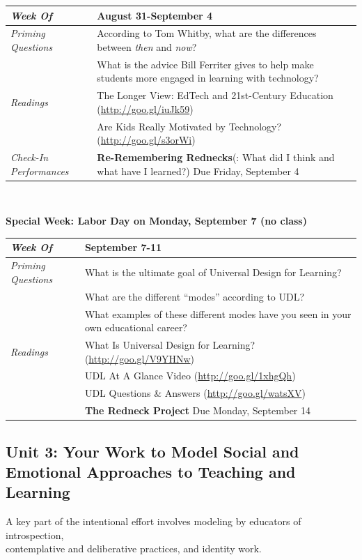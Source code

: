 \documentclass[two-side]{tufte-handout}
\newcommand{\gentopic}[1]{\begin{fullwidth}\begin{center}\faKey \textsf{#1}\end{center}\end{fullwidth}}
\newcommand{\tabpq}{\faQuestionCircle\medspace\textit{Priming Questions}}
\newcommand{\tabread}{\faBook\medspace\textit{Readings}}
\newcommand{\tabdt}{\faCalendar\medspace\textit{Week Of}}
\newcommand{\tabcheckin}{\faCheckSquareO\medspace\textit{Check-In Performances}}
\newcommand{\tabbreak}{\begin{fullwidth}\begin{center}\faAsterisk\faAsterisk\faAsterisk\\\end{center}\end{fullwidth}}
\newcommand{\specialweek}[1]{\begin{fullwidth}\begin{center}\textbf{\faBullhorn\medspace Special Week: #1 \medspace\faBullhorn}\end{center}\end{fullwidth}}
\newenvironment{tabsched}
	{\small
	\begin{tabular}{p{1.5in}p{4.5in}}
	\midrule}
	{\midrule
	\end{tabular}
	\normalsize}
\newcommand{\weekthree}{August 31-September 4}
\newcommand{\weekfour}{September 7-11}
\newcommand{\laborday}{Labor Day on Monday, September 7 (no class)}
\begin{document}
\begin{tabsched}
	\tabdt & \weekthree \\
	\midrule
	\tabpq & According to Tom Whitby, what are the differences between \textit{then} and \textit{now}? \\
	& What is the advice Bill Ferriter gives to help make students more engaged in learning with technology? \\
	\midrule
	\tabread & The Longer View: EdTech and 21st-Century Education (\url{http://goo.gl/iuJk59}) \\
	& Are Kids Really Motivated by Technology? (\url{http://goo.gl/s3orWi}) \\
	\midrule
	\tabcheckin & \textbf{Re-Remembering Rednecks}(: What did I think and what have I learned?) Due Friday, September 4 \\
\end{tabsched}

\tabbreak

\specialweek{\laborday}

\begin{tabsched}
	\tabdt & \weekfour \\
	\midrule
	\tabpq & What is the ultimate goal of Universal Design for Learning? \\
	& What are the different \enquote{modes} according to UDL? \\
	& What examples of these different modes have you seen in your own educational career? \\
	\midrule
	\tabread & What Is Universal Design for Learning? (\url{http://goo.gl/V9YHNw}) \\
	& UDL At A Glance Video (\url{http://goo.gl/1xhgQh}) \\
	& UDL Questions \& Answers (\url{http://goo.gl/watsXV}) \\
	\midrule
	\tabperfomance & \textbf{The Redneck Project} Due Monday, September 14 \\
\end{tabsched}

\newpage

\begin{fullwidth}
	\section{Unit 3: Your Work to Model Social and Emotional Approaches to Teaching and Learning}
\end{fullwidth}

\gentopic{A key part of the intentional effort involves modeling by educators of introspection,\\contemplative and deliberative practices, and identity work.}
\end{document}
